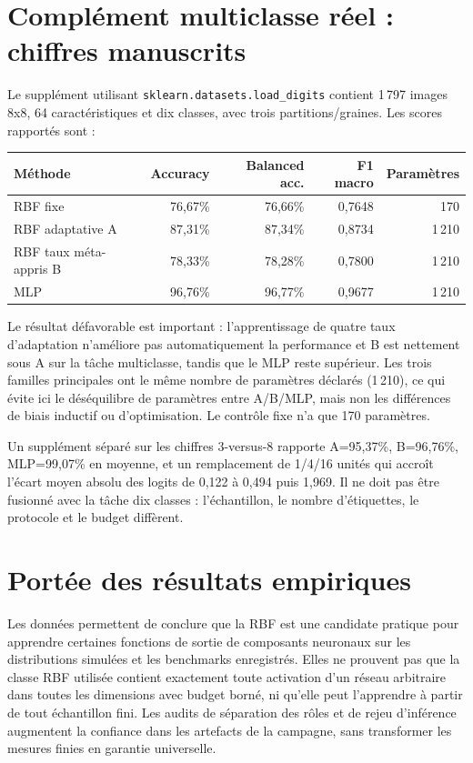 \documentclass[11pt,a4paper,oneside]{report}
\begin{document}
\section{Complément multiclasse réel : chiffres manuscrits}
Le supplément utilisant \texttt{sklearn.datasets.load\_digits} contient 1\,797 images 8x8, 64 caractéristiques et dix classes, avec trois partitions/graines. Les scores rapportés sont :
\begin{center}
\begin{tabular}{lrrrr}
\toprule
Méthode & Accuracy & Balanced acc. & F1 macro & Paramètres\\
\midrule
RBF fixe & 76,67\% & 76,66\% & 0,7648 & 170\\
RBF adaptative A & 87,31\% & 87,34\% & 0,8734 & 1\,210\\
RBF taux méta-appris B & 78,33\% & 78,28\% & 0,7800 & 1\,210\\
MLP & 96,76\% & 96,77\% & 0,9677 & 1\,210\\
\bottomrule
\end{tabular}
\end{center}
Le résultat défavorable est important : l'apprentissage de quatre taux d'adaptation n'améliore pas automatiquement la performance et B est nettement sous A sur la tâche multiclasse, tandis que le MLP reste supérieur. Les trois familles principales ont le même nombre de paramètres déclarés (1\,210), ce qui évite ici le déséquilibre de paramètres entre A/B/MLP, mais non les différences de biais inductif ou d'optimisation. Le contrôle fixe n'a que 170 paramètres.

Un supplément séparé sur les chiffres 3-versus-8 rapporte A=95,37\%, B=96,76\%, MLP=99,07\% en moyenne, et un remplacement de 1/4/16 unités qui accroît l'écart moyen absolu des logits de 0,122 à 0,494 puis 1,969. Il ne doit pas être fusionné avec la tâche dix classes : l'échantillon, le nombre d'étiquettes, le protocole et le budget diffèrent.

\section{Portée des résultats empiriques}
Les données permettent de conclure que la RBF est une candidate pratique pour apprendre certaines fonctions de sortie de composants neuronaux sur les distributions simulées et les benchmarks enregistrés. Elles ne prouvent pas que la classe RBF utilisée contient exactement toute activation d'un réseau arbitraire dans toutes les dimensions avec budget borné, ni qu'elle peut l'apprendre à partir de tout échantillon fini. Les audits de séparation des rôles et de rejeu d'inférence augmentent la confiance dans les artefacts de la campagne, sans transformer les mesures finies en garantie universelle.
\end{document}
